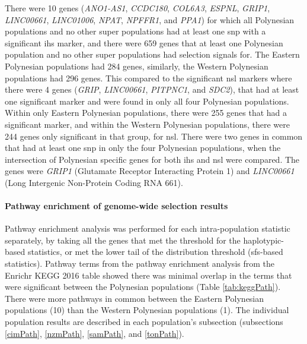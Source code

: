 \documentclass[twoside,openright]{report}
\let\oldparagraph\paragraph
\renewcommand{\paragraph}[1]{\oldparagraph{#1}\mbox{}}
\begin{document}
There were 10 genes (\emph{ANO1-AS1}, \emph{CCDC180}, \emph{COL6A3},
\emph{ESPNL}, \emph{GRIP1}, \emph{LINC00661}, \emph{LINC01006},
\emph{NPAT}, \emph{NPFFR1}, and \emph{PPA1}) for which all Polynesian
populations and no other super populations had at least one \gls{snp}
with a significant \gls{ihs} marker, and there were 659 genes that at
least one Polynesian population and no other super populations had
selection signals for. The Eastern Polynesian populations had 284 genes,
similarly, the Western Polynesian populations had 296 genes. This
compared to the significant \gls{nsl} markers where there were 4 genes
(\emph{GRIP}, \emph{LINC00661}, \emph{PITPNC1}, and \emph{SDC2}), that
had at least one significant marker and were found in only all four
Polynesian populations. Within only Eastern Polynesian populations,
there were 255 genes that had a significant marker, and within the
Western Polynesian populations, there were 244 genes only significant in
that group, for \gls{nsl}. There were two genes in common that had at
least one \gls{snp} in only the four Polynesian populations, when the
intersection of Polynesian specific genes for both \gls{ihs} and
\gls{nsl} were compared. The genes were \emph{GRIP1} (Glutamate Receptor
Interacting Protein 1) and \emph{LINC00661} (Long Intergenic Non-Protein
Coding RNA 661).

\paragraph{Pathway enrichment of genome-wide selection
results}\label{pathEnrich}

Pathway enrichment analysis was performed for each intra-population
statistic separately, by taking all the genes that met the threshold for
the haplotypic-based statistics, or met the lower tail of the
distribution threshold (\gls{sfs}-based statistics). Pathway terms from
the pathway enrichment analysis from the Enrichr KEGG 2016 table showed
there was minimal overlap in the terms that were significant between the
Polynesian populations (Table \ref{tab:keggPath}). There were more
pathways in common between the Eastern Polynesian populations (10) than
the Western Polynesian populations (1). The individual population
results are described in each population's subsection (subsections
\ref{cimPath}, \ref{nzmPath}, \ref{samPath}, and \ref{tonPath}).
\end{document}
